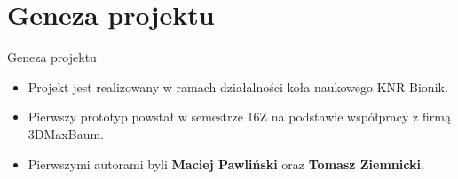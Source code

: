 \documentclass{beamer}
\begin{document}
\section{Geneza projektu}
\begin{frame}{Geneza projektu}
			\begin{itemize}
				\item {
					Projekt jest realizowany w ramach działalności koła naukowego KNR Bionik.
				}
				\item {
					Pierwszy prototyp powstał w semestrze 16Z na podstawie współpracy z firmą 3DMaxBaum.
				}
				\item {
					Pierwszymi autorami byli \textbf{Maciej Pawliński} oraz \textbf{Tomasz Ziemnicki}.	 	
				}
			\end{itemize}
			\begin{figure}%
				\centering
				\qquad
				\label{fig:example}%
			\end{figure}
\end{frame}
\end{document}
